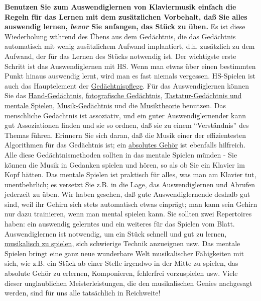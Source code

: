 \textbf{Benutzen Sie zum Auswendiglernen von Klaviermusik einfach die Regeln für das Lernen mit dem zusätzlichen Vorbehalt, daß Sie alles auswendig lernen, \textit{bevor} Sie anfangen, das Stück zu üben.}
Es ist diese Wiederholung während des Übens aus dem Gedächtnis, die das Gedächtnis automatisch mit wenig zusätzlichem Aufwand implantiert, d.h. zusätzlich zu dem Aufwand, der für das Lernen des Stücks notwendig ist.
Der wichtigste erste Schritt ist das Auswendiglernen mit HS.
Wenn man etwas über einen bestimmten Punkt hinaus auswendig lernt, wird man es fast niemals vergessen.
HS-Spielen ist auch das Hauptelement der \hyperref[c1iii6k]{Gedächtnispflege}.
Für das Auswendiglernen können Sie das \hyperref[c1iii6hand]{Hand-Gedächtnis}, \hyperref[c1iii6foto]{fotografische Gedächtnis}, \hyperref[c1iii6tastatur]{Tastatur-Gedächtnis und mentale Spielen}, \hyperref[c1iii6musik]{Musik-Gedächtnis} und die \hyperref[c1iii6theorie]{Musiktheorie} benutzen.
Das menschliche Gedächtnis ist assoziativ, und ein guter Auswendiglernender kann gut Assoziationen finden und sie so ordnen, daß sie zu einem \enquote{Verständnis} des Themas führen.
Erinnern Sie sich daran, daß die Musik einer der effizientesten Algorithmen für das Gedächtnis ist; ein \hyperref[c1iii12]{absolutes Gehör} ist ebenfalls hilfreich.
Alle diese Gedächtnismethoden sollten in das mentale Spielen münden - Sie können die Musik in Gedanken spielen und hören, so als ob Sie ein Klavier im Kopf hätten.
Das mentale Spielen ist praktisch für alles, was man am Klavier tut, unentbehrlich; es versetzt Sie z.B. in die Lage, das Auswendiglernen und Abrufen jederzeit zu üben.
Wir haben gesehen, daß gute Auswendiglernende deshalb gut sind, weil ihr Gehirn sich stets automatisch etwas einprägt; man kann sein Gehirn nur dazu trainieren, wenn man mental spielen kann.
Sie sollten zwei Repertoires haben: ein auswendig gelerntes und ein weiteres für das Spielen vom Blatt.
Auswendiglernen ist notwendig, um ein Stück schnell und gut zu lernen, \hyperref[c1iii14d]{musikalisch zu spielen}, sich schwierige Technik anzueignen usw.
Das mentale Spielen bringt eine ganz neue wunderbare Welt musikalischer Fähigkeiten mit sich, wie z.B. ein  Stück ab einer Stelle irgendwo in der Mitte zu spielen, das absolute Gehör zu erlernen, Komponieren, fehlerfrei vorzuspielen usw.
Viele dieser unglaublichen Meisterleistungen, die den musikalischen Genies nachgesagt werden, sind für uns alle tatsächlich in Reichweite!



